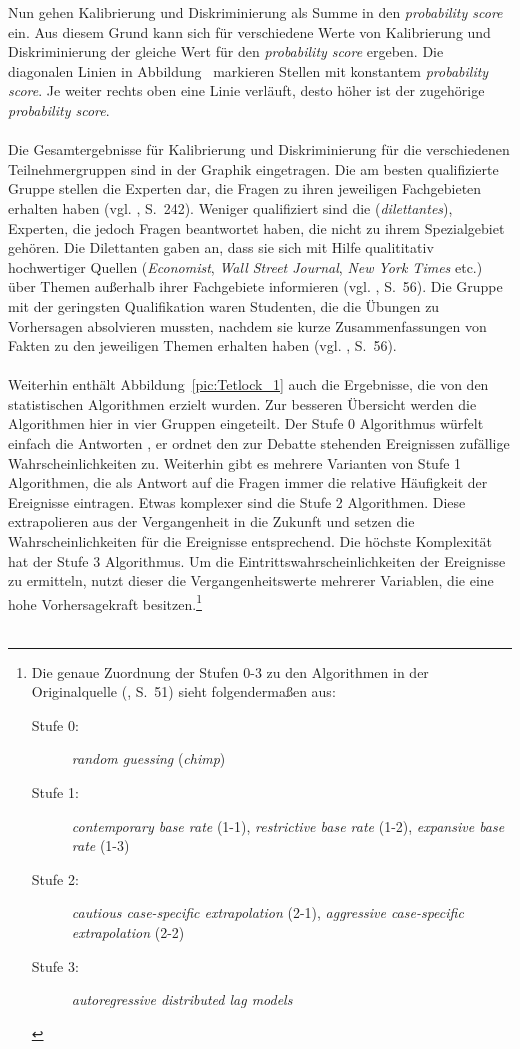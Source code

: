 Nun gehen Kalibrierung und Diskriminierung als Summe in den
\emph{probability score} ein. Aus diesem Grund kann sich für verschiedene
Werte von Kalibrierung und Diskriminierung der gleiche Wert für den
\emph{probability score} ergeben. Die diagonalen Linien in Abbildung~\xcom
markieren Stellen mit konstantem \emph{probability score}. Je weiter rechts oben
eine Linie verläuft, desto höher ist der zugehörige \emph{probability score}.
\\ \\
Die Gesamtergebnisse für Kalibrierung und Diskriminierung für die verschiedenen
Teilnehmergruppen sind in der Graphik eingetragen. Die am besten qualifizierte
Gruppe stellen die Experten dar, die Fragen zu ihren jeweiligen Fachgebieten
erhalten haben (vgl. \cite{Tetlock}, S.~242). Weniger qualifiziert sind die 
\grqq (\emph{dilettantes}), Experten, die jedoch Fragen
beantwortet haben, die nicht zu ihrem Spezialgebiet gehören. Die Dilettanten
gaben an, dass sie sich mit Hilfe qualititativ hochwertiger Quellen
(\emph{Economist}, \emph{Wall Street Journal}, \emph{New York Times} etc.) über
Themen außerhalb ihrer Fachgebiete informieren (vgl. \cite{Tetlock}, S.~56).
Die Gruppe mit der geringsten Qualifikation waren Studenten, die die Übungen
zu Vorhersagen absolvieren mussten, nachdem sie kurze Zusammenfassungen von
Fakten zu den jeweiligen Themen erhalten haben (vgl. \cite{Tetlock}, S.~56).
\\ \\
Weiterhin enthält Abbildung~\ref{pic:Tetlock_1} auch die Ergebnisse, die von den
statistischen Algorithmen erzielt wurden. Zur besseren Übersicht werden die
Algorithmen hier in vier Gruppen eingeteilt. Der Stufe 0 Algorithmus würfelt
einfach die Antworten , er ordnet den zur Debatte stehenden Ereignissen
zufällige Wahrscheinlichkeiten zu. Weiterhin gibt es mehrere Varianten von
Stufe 1 Algorithmen, die als Antwort auf die Fragen immer die relative
Häufigkeit der Ereignisse eintragen. Etwas komplexer sind die Stufe 2
Algorithmen. Diese extrapolieren aus der Vergangenheit in die Zukunft und setzen
die Wahrscheinlichkeiten für die Ereignisse entsprechend. Die höchste
Komplexität hat der Stufe 3 Algorithmus. Um die Eintrittswahrscheinlichkeiten
der Ereignisse zu ermitteln, nutzt dieser die Vergangenheitswerte mehrerer
Variablen, die eine hohe Vorhersagekraft besitzen.\footnote{Die genaue Zuordnung
der Stufen 0-3 zu den Algorithmen in der Originalquelle (\cite{Tetlock}, S.~51)
sieht folgendermaßen aus:
\begin{description}
\item[Stufe 0:] \emph{random guessing} (\emph{chimp})
\item[Stufe 1:] \emph{contemporary base rate} (1-1), \emph{restrictive base
  rate} (1-2), \emph{expansive base rate} (1-3)
\item[Stufe 2:] \emph{cautious case-specific extrapolation} (2-1),
  \emph{aggressive case-specific extrapolation} (2-2)
\item[Stufe 3:] \emph{autoregressive distributed lag models}
\end{description}
} \\ \\
